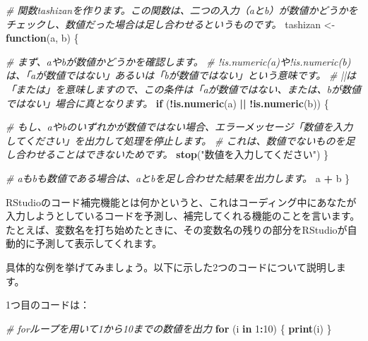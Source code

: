 \documentclass[
]{article}
\newenvironment{Shaded}{\begin{snugshade}}{\end{snugshade}}
\newcommand{\CommentTok}[1]{\textcolor[rgb]{0.56,0.35,0.01}{\textit{#1}}}
\newcommand{\ControlFlowTok}[1]{\textcolor[rgb]{0.13,0.29,0.53}{\textbf{#1}}}
\newcommand{\DecValTok}[1]{\textcolor[rgb]{0.00,0.00,0.81}{#1}}
\newcommand{\FunctionTok}[1]{\textcolor[rgb]{0.13,0.29,0.53}{\textbf{#1}}}
\newcommand{\NormalTok}[1]{#1}
\newcommand{\OtherTok}[1]{\textcolor[rgb]{0.56,0.35,0.01}{#1}}
\newcommand{\SpecialCharTok}[1]{\textcolor[rgb]{0.81,0.36,0.00}{\textbf{#1}}}
\newcommand{\StringTok}[1]{\textcolor[rgb]{0.31,0.60,0.02}{#1}}
\begin{document}
\begin{Shaded}
\begin{Highlighting}[]
\CommentTok{\# 関数\textquotesingle{}tashizan\textquotesingle{}を作ります。この関数は、二つの入力（\textquotesingle{}a\textquotesingle{}と\textquotesingle{}b\textquotesingle{}）が数値かどうかをチェックし、数値だった場合は足し合わせるというものです。}
\NormalTok{tashizan }\OtherTok{\textless{}{-}} \ControlFlowTok{function}\NormalTok{(a, b) \{}

  \CommentTok{\# まず、\textquotesingle{}a\textquotesingle{}や\textquotesingle{}b\textquotesingle{}が数値かどうかを確認します。}
  \CommentTok{\# \textquotesingle{}!is.numeric(a)\textquotesingle{}や\textquotesingle{}!is.numeric(b)\textquotesingle{}は、「aが数値ではない」あるいは「bが数値ではない」という意味です。}
  \CommentTok{\# \textquotesingle{}||\textquotesingle{}は「または」を意味しますので、この条件は「aが数値ではない、または、bが数値ではない」場合に真となります。}
  \ControlFlowTok{if}\NormalTok{ (}\SpecialCharTok{!}\FunctionTok{is.numeric}\NormalTok{(a) }\SpecialCharTok{||} \SpecialCharTok{!}\FunctionTok{is.numeric}\NormalTok{(b)) \{}

    \CommentTok{\# もし、\textquotesingle{}a\textquotesingle{}や\textquotesingle{}b\textquotesingle{}のいずれかが数値ではない場合、エラーメッセージ「数値を入力してください」を出力して処理を停止します。}
    \CommentTok{\# これは、数値でないものを足し合わせることはできないためです。}
    \FunctionTok{stop}\NormalTok{(}\StringTok{"数値を入力してください"}\NormalTok{)}
\NormalTok{  \}}

  \CommentTok{\# \textquotesingle{}a\textquotesingle{}も\textquotesingle{}b\textquotesingle{}も数値である場合は、\textquotesingle{}a\textquotesingle{}と\textquotesingle{}b\textquotesingle{}を足し合わせた結果を出力します。}
\NormalTok{  a }\SpecialCharTok{+}\NormalTok{ b}
\NormalTok{\}}
\end{Highlighting}
\end{Shaded}

RStudioのコード補完機能とは何かというと、これはコーディング中にあなたが入力しようとしているコードを予測し、補完してくれる機能のことを言います。たとえば、変数名を打ち始めたときに、その変数名の残りの部分をRStudioが自動的に予測して表示してくれます。

具体的な例を挙げてみましょう。以下に示した2つのコードについて説明します。

1つ目のコードは：

\begin{Shaded}
\begin{Highlighting}[]
\CommentTok{\# forループを用いて1から10までの数値を出力}
\ControlFlowTok{for}\NormalTok{ (i }\ControlFlowTok{in} \DecValTok{1}\SpecialCharTok{:}\DecValTok{10}\NormalTok{) \{}
  \FunctionTok{print}\NormalTok{(i)}
\NormalTok{\}}
\end{Highlighting}
\end{Shaded}
\end{document}
